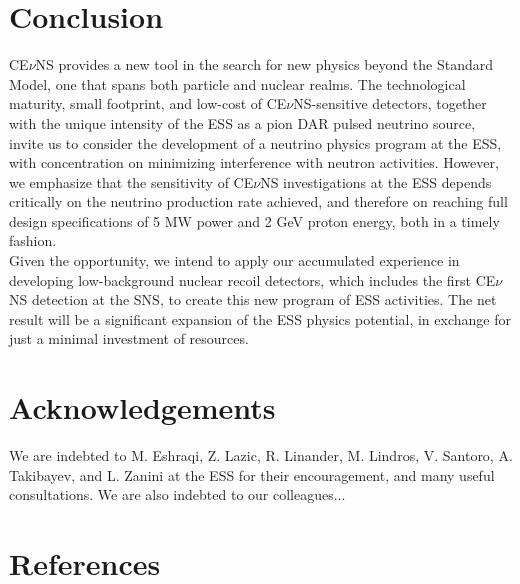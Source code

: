 \documentclass[12pt]{article}
\begin{document}
\newpage

\section{Conclusion}

CE$\nu$NS provides a new tool in the search for new physics beyond the Standard Model, one that spans both particle and nuclear realms. The technological maturity, small footprint, and low-cost of CE$\nu$NS-sensitive detectors, together with the unique intensity of the ESS as a pion DAR pulsed neutrino source, invite us to consider the development of a neutrino physics program at the ESS, with concentration on minimizing interference with neutron activities. However, we emphasize that the sensitivity of CE$\nu$NS investigations at the ESS depends critically on the neutrino production rate achieved, and therefore on reaching full design specifications of 5 MW power and 2 GeV proton energy, both in a timely fashion.\\

Given the opportunity, we intend to apply our accumulated experience in developing low-background nuclear recoil detectors, which includes the first CE$\nu$NS detection at the SNS, to create this new program of ESS activities. The net result will be a significant expansion of the ESS physics potential, in exchange for just a minimal investment of resources. 

\section{Acknowledgements}

We are indebted to M. Eshraqi, Z. Lazic, R. Linander, M. Lindros, V. Santoro, A. Takibayev, and L. Zanini at the ESS for their encouragement, and many useful consultations. We are also indebted to our colleagues...


\newpage
\section{References}



\end{document}
